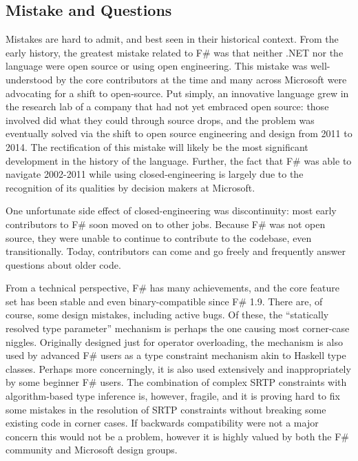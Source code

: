 \documentclass[acmsmall]{acmart}\settopmatter{}
\begin{document}
\subsection*{Mistake and Questions}

Mistakes are hard to admit, and best seen in their historical context.  From the early history,
the greatest mistake related to F\# was that neither .NET nor the language were open source
or using open engineering.  This mistake was well-understood by the core contributors at the time
and many across Microsoft were advocating for a shift to open-source. Put simply, an innovative language
grew in the research lab of a company that had not yet embraced open source: those involved did
what they could through source drops, and the problem was eventually solved via the shift to open
source engineering and design from 2011 to 2014. The rectification of this mistake will likely be
the most significant development in the history of the language. Further, the fact
that F\# was able to navigate 2002-2011 while using closed-engineering is largely due to the
recognition of its qualities by decision makers at Microsoft.

One unfortunate side effect of closed-engineering was discontinuity: most early
contributors to F\# soon moved on to other jobs. Because F\# was not open source, they
were unable to continue to contribute to the codebase, even transitionally. Today, contributors
can come and go freely and frequently answer questions about older code.

From a technical perspective, F\# has many achievements, and the core feature set has
been stable and even binary-compatible since F\# 1.9.  There are, of course, some
design mistakes, including active bugs.  Of these, the “statically resolved type parameter”
mechanism is perhaps the one causing most corner-case niggles. Originally designed just for
operator overloading, the mechanism is also used by advanced F\# users as a type constraint
mechanism akin to Haskell type classes. Perhaps more concerningly, it is also used extensively
and inappropriately by some beginner F\# users.   The combination of complex SRTP constraints
with algorithm-based type inference is, however, fragile, and it is proving hard to fix some
mistakes in the resolution of SRTP constraints without breaking some existing code in
corner cases.  If backwards compatibility were not a major concern this would not be
a problem, however it is highly valued by both the F\# community and Microsoft design groups.
\end{document}
